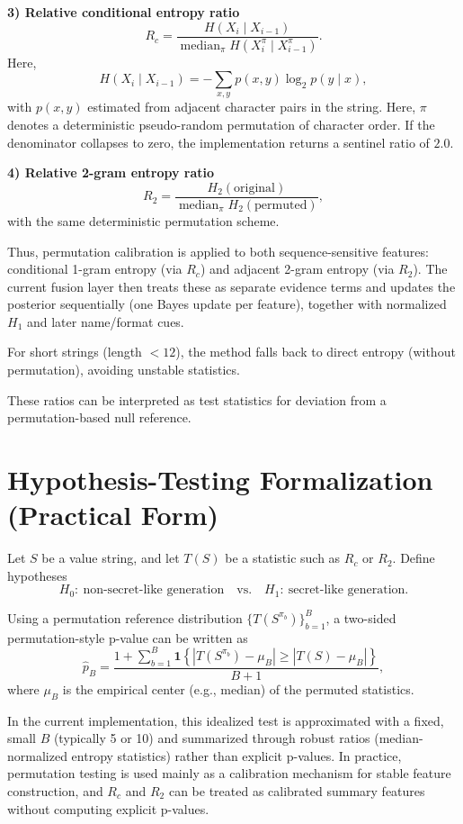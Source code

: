 \documentclass[10pt]{article}
\begin{document}
\textbf{3) Relative conditional entropy ratio}
\[
R_c = \frac{H(X_i\mid X_{i-1})}{\operatorname{median}_{\pi} H\!\left(X_i^{\pi}\mid X_{i-1}^{\pi}\right)}.
\]
Here,
\[
H(X_i\mid X_{i-1}) = -\sum_{x,y} p(x,y)\log_2 p(y\mid x),
\]
with $p(x,y)$ estimated from adjacent character pairs in the string.
Here, $\pi$ denotes a deterministic pseudo-random permutation of character order. If the denominator collapses to zero, the implementation returns a sentinel ratio of $2.0$.

\textbf{4) Relative 2-gram entropy ratio}
\[
R_2 = \frac{H_2(\text{original})}{\operatorname{median}_{\pi} H_2(\text{permuted})},
\]
with the same deterministic permutation scheme.

Thus, permutation calibration is applied to both sequence-sensitive features: conditional 1-gram entropy (via $R_c$) and adjacent 2-gram entropy (via $R_2$). The current fusion layer then treats these as separate evidence terms and updates the posterior sequentially (one Bayes update per feature), together with normalized $H_1$ and later name/format cues.

For short strings (length $<12$), the method falls back to direct entropy (without permutation), avoiding unstable statistics.

These ratios can be interpreted as test statistics for deviation from a permutation-based null reference.

\section*{Hypothesis-Testing Formalization (Practical Form)}

Let $S$ be a value string, and let $T(S)$ be a statistic such as $R_c$ or $R_2$.
Define hypotheses
\[
H_0:\ \text{non-secret-like generation} \quad\text{vs.}\quad H_1:\ \text{secret-like generation}.
\]

Using a permutation reference distribution $\{T(S^{\pi_b})\}_{b=1}^B$, a two-sided permutation-style p-value can be written as
\[
\hat p_B = \frac{1 + \sum_{b=1}^{B}\mathbf{1}\!\left\{\left|T(S^{\pi_b})-\mu_B\right| \geq \left|T(S)-\mu_B\right|\right\}}{B+1},
\]
where $\mu_B$ is the empirical center (e.g., median) of the permuted statistics.

In the current implementation, this idealized test is approximated with a fixed, small $B$ (typically 5 or 10) and summarized through robust ratios (median-normalized entropy statistics) rather than explicit p-values. In practice, permutation testing is used mainly as a calibration mechanism for stable feature construction, and $R_c$ and $R_2$ can be treated as calibrated summary features without computing explicit p-values.
\end{document}

